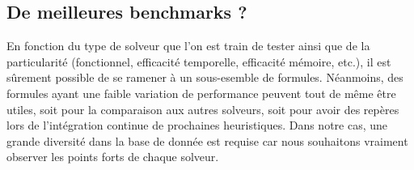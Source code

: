 \documentclass[11pt,a4paper]{article}
\begin{document}
\subsection{De meilleures benchmarks ?}

En fonction du type de solveur que l'on est train de tester ainsi que de la particularité (fonctionnel, efficacité temporelle, efficacité mémoire, etc.), il est sûrement possible de se ramener à un sous-esemble de formules. Néanmoins, des formules ayant une faible variation de performance peuvent tout de même être utiles, soit pour la comparaison aux autres solveurs, soit pour avoir des repères lors de l'intégration continue de prochaines heuristiques. 
Dans notre cas, une grande diversité dans la base de donnée est requise car nous souhaitons vraiment observer les points forts de chaque solveur.
\end{document}
